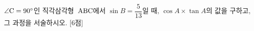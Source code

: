 $\angle\mathrm{C}=90^\circ$인 직각삼각형~$\mathrm{ABC}$에서 $\sin B=\dfrac{5}{13}$일 때, $\cos A\times\tan A$의 값을 구하고, 그 과정을 서술하시오. \mbox{[6점]}
